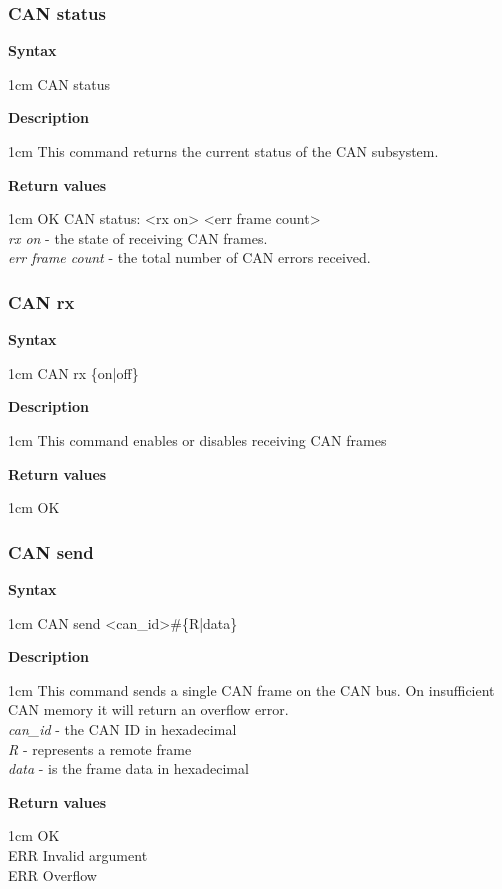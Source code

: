 \documentclass{article}[a4paper]
\begin{document}
\subsubsection{CAN status}
\begin{tcolorbox}
	{\bf Syntax}

	 1cm \dimexpr\linewidth-2cm\relax
	CAN status

	\medskip
	{\bf Description}

	 1cm \dimexpr\linewidth-2cm\relax
	This command returns the current status of the CAN subsystem.

	\medskip
	{\bf Return values}

	 1cm \dimexpr\linewidth-2cm\relax
	OK CAN status: <rx on> <err frame count>
	\medskip \\
	{\it rx on} - the state of receiving CAN frames. \\
	{\it err frame count} - the total number of CAN errors received.
\end{tcolorbox}

\subsubsection{CAN rx}
\begin{tcolorbox}
	{\bf Syntax}

	 1cm \dimexpr\linewidth-2cm\relax
	CAN rx \{on|off\}

	\medskip
	{\bf Description}

	 1cm \dimexpr\linewidth-2cm\relax
	This command enables or disables receiving CAN frames

	\medskip
	{\bf Return values}

	 1cm \dimexpr\linewidth-2cm\relax
	OK
\end{tcolorbox}

\subsubsection{CAN send}
\begin{tcolorbox}
	{\bf Syntax}

	 1cm \dimexpr\linewidth-2cm\relax
	CAN send <can\_id>\#\{R|data\}

	\medskip
	{\bf Description}

	 1cm \dimexpr\linewidth-2cm\relax
	This command sends a single CAN frame on the CAN bus. On insufficient CAN
	memory it will return an overflow error.
	\medskip \\
	{\it can\_id} - the CAN ID in hexadecimal \\
	{\it R} - represents a remote frame \\
	{\it data} - is the frame data in hexadecimal

	\medskip
	{\bf Return values}

	 1cm \dimexpr\linewidth-2cm\relax
	OK \\
	ERR Invalid argument \\
	ERR Overflow
\end{tcolorbox}
\end{document}
